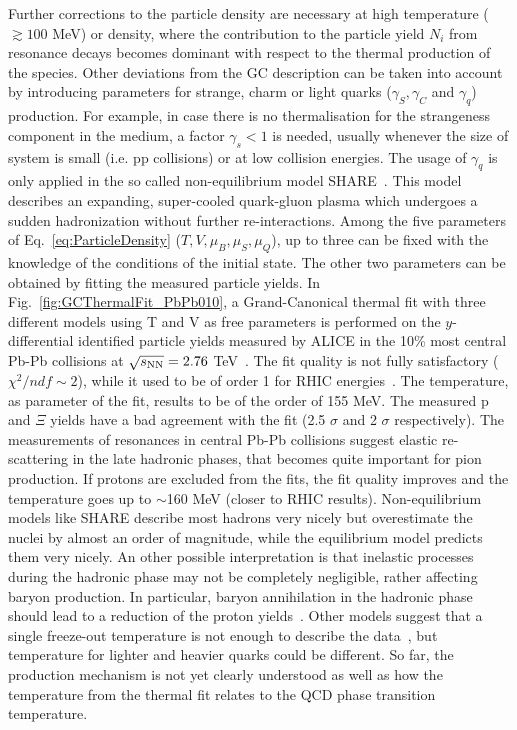 Further corrections to the particle density are necessary at high 
temperature ($\gtrsim 100 $ MeV) or density, where the contribution 
to the particle yield $N_{i}$ from resonance decays becomes 
dominant with respect to the thermal production of the species. 
Other deviations from the GC description can be taken into 
account by introducing parameters for strange, charm or 
light quarks ($\gamma_{S}, \gamma_{C}$ and $\gamma_{q}$) 
production. For example, in case there is no thermalisation for 
the strangeness component in the medium, a factor 
$\gamma_{s}<1$ is needed, usually whenever the size of system 
is small (i.e. pp collisions) or at low collision energies. 
The usage of $\gamma_{q}$ is only applied in the so called 
non-equilibrium model SHARE~\cite{Petran:2013lja}. This model 
describes an expanding, super-cooled quark-gluon plasma which 
undergoes a sudden hadronization without further re-interactions.
Among the five parameters of Eq.~\ref{eq:ParticleDensity} 
($T, V, \mu_B, \mu_S, \mu_Q$), up to three can be fixed with
 the knowledge of the conditions of the initial state. 
 The other two parameters can be obtained by fitting the measured
  particle yields. In Fig.~\ref{fig:GCThermalFit_PbPb010}, a 
  Grand-Canonical thermal fit with three different models using 
  T and V as free parameters is performed on the $y$-differential 
  identified particle yields measured by ALICE in the 10\% most 
  central Pb-Pb collisions at $\sqrt{s_{\rm NN}} = 2.76$ TeV~\cite{Floris:2014pta}. 
  The fit quality is not fully satisfactory ($\chi^{2}/ndf \sim 2$), 
  while it used to be of order 1 for RHIC energies~\cite{Andronic:2008gu}. 
  The temperature, as parameter of the fit, results to be of the order of 155 MeV. 
The measured p and $\Xi$ yields have a bad agreement with the fit 
(2.5 $\sigma$ and 2 $\sigma$ respectively). The measurements of resonances 
in central Pb-Pb collisions suggest elastic re-scattering in the late 
hadronic phases, that becomes quite important for pion production. 
If protons are excluded from the fits, the fit quality improves and the 
temperature goes up to $\sim$160 MeV (closer to RHIC results). 
Non-equilibrium models like SHARE describe most hadrons very 
nicely but overestimate the nuclei by almost an order of magnitude, 
while the equilibrium model predicts them very nicely. An other possible
interpretation is that inelastic processes during the hadronic phase may
not be completely negligible, rather affecting baryon production. In 
particular, baryon annihilation in the hadronic phase should lead
to a reduction of the proton yields~\cite{Becattini:2014hla,Becattini:2012xb}. Other models 
suggest that a single freeze-out temperature is not enough to describe
 the data~\cite{Bellwied:2013cta}, but temperature for lighter and heavier
  quarks could be different. So far, the production mechanism is not yet 
  clearly understood as well as how the temperature from the thermal 
  fit relates to the QCD phase transition temperature.
  
